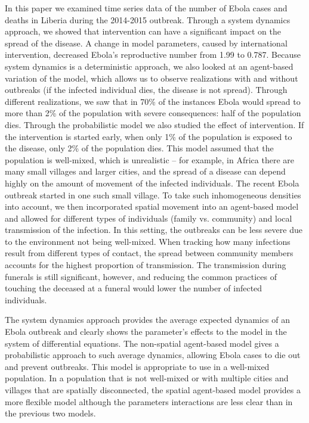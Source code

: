 In this paper we examined time series data of the number of Ebola cases and deaths in Liberia during the 2014-2015 outbreak. Through a system dynamics approach, we showed that intervention can have a significant impact on the spread of the disease. A change in model parameters, caused by international intervention, decreased Ebola's reproductive number from 1.99 to 0.787. Because system dynamics is a deterministic approach, we also looked at an agent-based variation of the model, which allows us to observe realizations with and without outbreaks (if the infected individual dies, the disease is not spread). Through different realizations, we saw that in 70\% of the instances Ebola would spread to more than 2\% of the population with severe consequences: half of the population dies. Through the probabilistic model we also studied the effect of intervention. If the intervention is started early, when only 1\% of the population is exposed to the disease, only 2\% of the population dies. This model assumed that the population is well-mixed, which is unrealistic -- for example, in Africa there are many small villages and larger cities, and the spread of a disease can depend highly on the amount of movement of the infected individuals. The recent Ebola outbreak started in one such small village. To take such inhomogeneous densities into account, we then incorporated spatial movement into an agent-based model and allowed for different types of individuals (family vs. community) and local transmission of the infection. In this setting, the outbreaks can be less severe due to the environment not being well-mixed. When tracking how many infections result from different types of contact, the spread between community members accounts for the highest proportion of transmission. The transmission during funerals is still significant, however, and reducing the common practices of touching the deceased at a funeral would lower the number of infected individuals. 

The system dynamics approach provides the average expected dynamics of an Ebola outbreak and clearly shows the parameter's effects to the model in the system of differential equations. The non-spatial agent-based model gives a probabilistic approach to such average dynamics, allowing Ebola cases to die out and prevent outbreaks. This model is appropriate to use in a well-mixed population. In a population that is not well-mixed or with multiple cities and villages that are spatially disconnected, the spatial agent-based model provides a more flexible model although the parameters interactions are less clear than in the previous two models.

